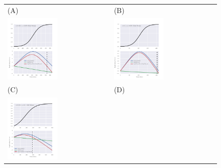 \documentclass[11pt]{article}
\begin{document}
\begin{figure}[H]
	\centering
	\begin{tabular}{l|l}
			(A)&(B)\\
			\includegraphics[width=0.5\textwidth]{figures/decayFactors0}
			&\includegraphics[width=0.5\textwidth]{figures/decayFactors1}\\
			\hline(C)&(D)\\
			\includegraphics[width=0.5\textwidth]{figures/decayFactors2}

\end{tabular}
\end{figure}
\end{document}

